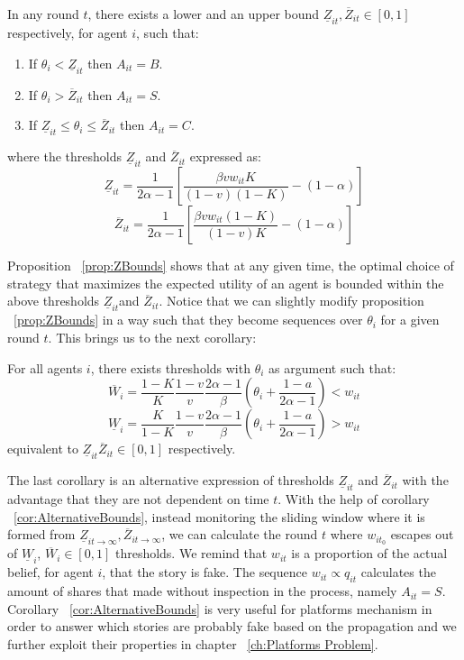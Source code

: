 \begin{prop}
	In any round $t$, there exists a lower and an upper bound $\underline{Z}_{it}, \overline{Z}_{it} \in [0,1]$ respectively, for agent $i$, such that:
	
	\begin{enumerate}
		\item If $\theta_i < \underline{Z}_{it}$ then $A_{it}=B$.
		\item If $\theta_i > \overline{Z}_{it}$ then $A_{it}=S$.
		\item If $\underline{Z}_{it} \leq \theta_i \leq \overline{Z}_{it}$ then $A_{it}=C$.
	\end{enumerate}
where the thresholds $\underline{Z}_{it}$ and  $\overline{Z}_{it}$ expressed as:
$$\underline{Z}_{it}=\displaystyle\frac{1}{2\alpha-1}\left[\frac{\beta v w_{it} K}{(1-v)(1-K)}-(1-\alpha)\right]$$
$$\overline{Z}_{it}=\displaystyle\frac{1}{2\alpha-1}\left[\frac{\beta v w_{it} (1-K)}{(1-v)K}-(1-\alpha)\right]$$
	\label{prop:ZBounds}
\end{prop}

Proposition ~\ref{prop:ZBounds} shows that at any given time, the optimal choice of strategy that maximizes the expected utility of an agent is bounded within the above thresholds $\underline{Z}_{it}$and $ \overline{Z}_{it}$. Notice that we can slightly modify proposition ~\ref{prop:ZBounds} in a way such that they become sequences over $\theta_i$ for a given round $t$. This brings us to the next corollary: 

\begin{corollary}
	For all agents $i$, there exists thresholds with $\theta_i$ as argument such that:
	$$ \overline{W}_{i}=\frac{1-K}{K}\frac{1-v}{v}\frac{2\alpha-1}{\beta}\left(\theta_i+\frac{1-a}{2\alpha-1}\right) < w_{it} $$
	$$ \underline{W}_{i}=\frac{K}{1-K}\frac{1-v}{v}\frac{2\alpha-1}{\beta}\left(\theta_i+\frac{1-a}{2\alpha-1}\right) > w_{it} $$
	equivalent to $\underline{Z}_{it} \overline{Z}_{it} \in [0,1]$ respectively.
	\label{cor:AlternativeBounds}
\end{corollary}
The last corollary is an alternative expression of thresholds $\underline{Z}_{it}$ and $\overline{Z}_{it}$ with the advantage that they are not dependent on time $t$. With the help of corollary ~\ref{cor:AlternativeBounds}, instead monitoring the sliding window where it is formed from $\underline{Z}_{it\rightarrow \infty}, \overline{Z}_{it\rightarrow \infty}$, we can calculate the round $t$ where $w_{it_0}$ escapes out of $\underline{W}_{i}$, $ \overline{W}_{i} \in [0,1]$  thresholds. We remind that $w_{it}$ is a proportion of the actual belief, for agent $i$, that the story is fake. The sequence $w_{it} \propto q_{it}$ calculates the amount of shares that made without inspection in the process, namely $A_{it}=S$. Corollary ~\ref{cor:AlternativeBounds} is very useful for platforms mechanism in order to answer which stories are probably fake based on the propagation and we further exploit their properties in chapter ~\ref{ch:Platforms Problem}.


